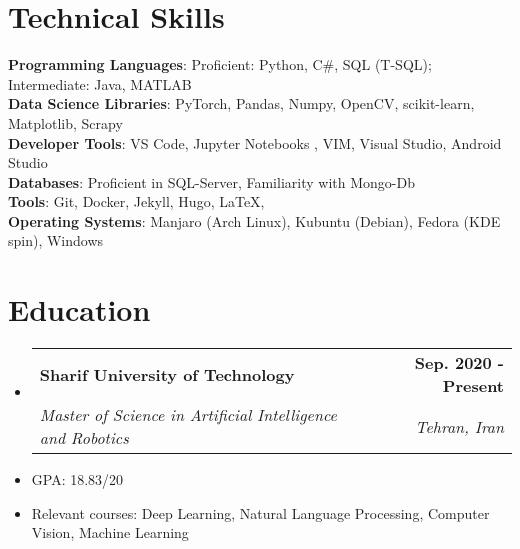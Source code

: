 \documentclass[letterpaper,11pt]{article}
\makeatletter
\newcommand{\resumeSubheading}[4]{
  \vspace{-2pt}\item
    \begin{tabular*}{1.0\textwidth}[t]{l@{\extracolsep{\fill}}r}
      \textbf{#1} & \textbf{\small #2} \\
    \textcolor{sgray} {\textit{\small#3}} & \textcolor{sgray}{ \textit{\small #4} }\\
    \end{tabular*}\vspace{-7pt}
}
\newcommand{\resumeSubheadingD}[5]{
  \vspace{-2pt}\item
    \begin{tabular*}{1.0\textwidth}[t]{l@{\extracolsep{\fill}}r}
      \textbf{#1} & \textbf{\small #2} \\
    \textcolor{sgray} {\textit{\small#3}} & \textcolor{sgray}{ \textit{\small #4} }\\
    \end{tabular*} %
    \\ \vspace{3pt}
    Description:{#5}
}
\newcommand{\resumeSubHeadingListStart}{\begin{itemize}[leftmargin=0.0in, label={}]}
\newcommand{\resumeSubHeadingListEnd}{\end{itemize}}
\makeatother
\begin{document}
\begin{comment}
\resumeSubHeadingListStart
\resumeSubheadingD
{English Teacher }{July 2017 – January 2018}
{Zaban Gostar Institute  }{Supervisor: F. Fatemi}
{ I served as an English teacher for pre-intermediate students for one semester
}
\resumeSubHeadingListEnd
\end{comment} 


\section{Technical Skills}
\begin{itemize}[leftmargin=0.15in, 
	label={}
	]
	\small{\item{
			\textbf{Programming Languages}{: Proficient: Python, C\#, SQL (T-SQL); Intermediate: Java, MATLAB } \\
			\textbf{Data Science Libraries}: PyTorch, Pandas, Numpy, OpenCV, scikit-learn, Matplotlib, Scrapy \\
			\textbf{Developer Tools}{:  VS Code, Jupyter Notebooks , VIM, Visual Studio, Android Studio} \\
			\textbf{Databases}{: Proficient in SQL-Server, Familiarity with Mongo-Db } \\
			\textbf{Tools}{: Git, Docker, Jekyll, Hugo, \LaTeX , } \\
			\textbf{Operating Systems}{: Manjaro  (Arch Linux), Kubuntu  (Debian), Fedora (KDE spin), Windows } \\
	}}
\end{itemize}
\vspace{-16pt}



\section{Education}
  \resumeSubHeadingListStart
    \resumeSubheading
      {Sharif University of Technology}{Sep. 2020 - Present}
      {Master of Science in Artificial Intelligence and Robotics}{Tehran, Iran}
  \resumeSubHeadingListEnd
    

\begin{itemize}[itemsep=-3pt, parsep=5pt]
\item  GPA: 18.83/20

\item Relevant courses:
Deep Learning,
Natural Language Processing, Computer Vision,
Machine Learning 
\end{itemize}  
\end{document}
